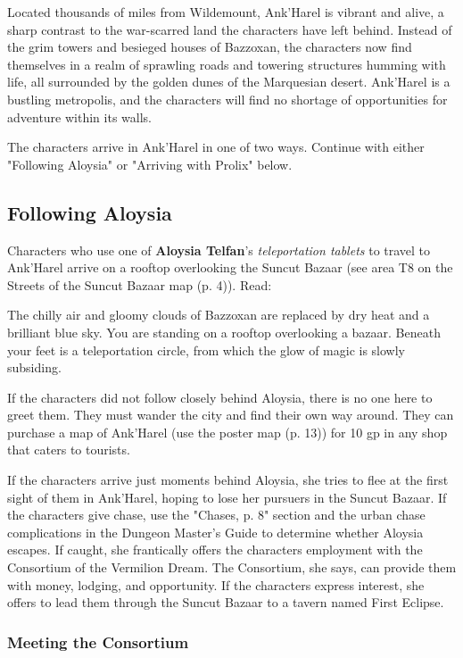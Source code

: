 \documentclass[letterpaper, 11pt, bg=full, twocolumn]{dndbook}
\begin{document}
Located thousands of miles from Wildemount, Ank'Harel is vibrant and alive, a sharp contrast to the war-scarred land the characters have left behind. Instead of the grim towers and besieged houses of Bazzoxan, the characters now find themselves in a realm of sprawling roads and towering structures humming with life, all surrounded by the golden dunes of the Marquesian desert. Ank'Harel is a bustling metropolis, and the characters will find no shortage of opportunities for adventure within its walls.

The characters arrive in Ank'Harel in one of two ways. Continue with either "Following Aloysia" or "Arriving with Prolix" below.

\subsection{Following Aloysia}

Characters who use one of \textbf{Aloysia Telfan}'s \textit{teleportation tablets} to travel to Ank'Harel arrive on a rooftop overlooking the Suncut Bazaar (see area T8 on the Streets of the Suncut Bazaar map (p. 4)). Read:

\begin{DndReadAloud}
The chilly air and gloomy clouds of Bazzoxan are replaced by dry heat and a brilliant blue sky. You are standing on a rooftop overlooking a bazaar. Beneath your feet is a teleportation circle, from which the glow of magic is slowly subsiding.
\end{DndReadAloud}

If the characters did not follow closely behind Aloysia, there is no one here to greet them. They must wander the city and find their own way around. They can purchase a map of Ank'Harel (use the poster map (p. 13)) for 10 gp in any shop that caters to tourists.

If the characters arrive just moments behind Aloysia, she tries to flee at the first sight of them in Ank'Harel, hoping to lose her pursuers in the Suncut Bazaar. If the characters give chase, use the "Chases, p. 8" section and the urban chase complications in the Dungeon Master's Guide to determine whether Aloysia escapes. If caught, she frantically offers the characters employment with the Consortium of the Vermilion Dream. The Consortium, she says, can provide them with money, lodging, and opportunity. If the characters express interest, she offers to lead them through the Suncut Bazaar to a tavern named First Eclipse.

\subsubsection{Meeting the Consortium}
\end{document}
